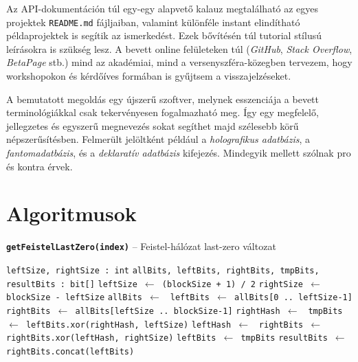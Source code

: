 \documentclass[
    parspace,
    noindent,
    nohyp,
]{elteiktdk}[2023/04/10]
\begin{document}
Az API-dokumentáción túl egy-egy alapvető kalauz megtalálható
az egyes projektek \texttt{README.md} fájljaiban,
valamint különféle instant elindítható példaprojektek is segítik az ismerkedést.
Ezek bővítésén túl tutorial stílusú leírásokra is szükség lesz.
A bevett online felületeken túl (\textit{GitHub}, \textit{Stack Overflow}, \textit{BetaPage} stb.)
mind az akadémiai, mind a versenyszféra-közegben tervezem,
hogy workshopokon és kérdőíves formában is gyűjtsem a visszajelzéseket.

A bemutatott megoldás egy újszerű szoftver,
melynek esszenciája a bevett terminológiákkal csak tekervényesen fogalmazható meg.
Így egy megfelelő, jellegzetes és egyszerű megnevezés
sokat segíthet majd szélesebb körű népszerűsítésben.
Felmerült jelöltként például
a \textit{holografikus adatbázis},
a \textit{fantomadatbázis},
és a \textit{deklaratív adatbázis} kifejezés.
Mindegyik mellett szólnak pro és kontra érvek.

\pagebreak


{}
\begin{spacing}{1.15}
\printbibliography[title=\biblabel]
\end{spacing}
\cleardoublepage


\appendix

\chapter{Algoritmusok}

{}

\begin{algorithm}[H]
\caption[Feistel-hálózat last-zero változat]{\textbf{\texttt{getFeistelLastZero(index)}} -- Feistel-hálózat last-zero változat}\label{algorithm:feistel}
\begin{algorithmic}[1]
    \scriptsize
    \State {}
    \State \texttt{leftSize, rightSize : int}
    \State \texttt{allBits, leftBits, rightBits, tmpBits, resultBits : bit[]}
    \State \texttt{leftSize $\gets$ (blockSize + 1) / 2}
    \State \texttt{rightSize $\gets$ blockSize - leftSize}
    \State \texttt{allBits $\gets$ }
    \State \texttt{leftBits $\gets$ allBits[0 .. leftSize-1]}
    \State \texttt{rightBits $\gets$ allBits[leftSize .. blockSize-1]}
        \State \texttt{rightHash $\gets$ }
        \State \texttt{tmpBits $\gets$ leftBits.xor(rightHash, leftSize)}
        \State \texttt{leftHash $\gets$ }
        \State \texttt{rightBits $\gets$ rightBits.xor(leftHash, rightSize)}
        \State \texttt{leftBits $\gets$ tmpBits}
    \EndFor
    \State \texttt{resultBits $\gets$ rightBits.concat(leftBits)}
    \State \texttt{}
\end{algorithmic}
\end{algorithm}
\end{document}
